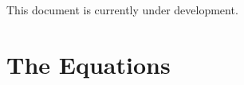 \documentclass[10pt]{article}
\begin{document}
This document is currently under development. 


\bigskip
 


% 

% 

\section{The Equations}


\clearpage



\clearpage



\clearpage



\vfill\eject





\printindex
\end{document}
